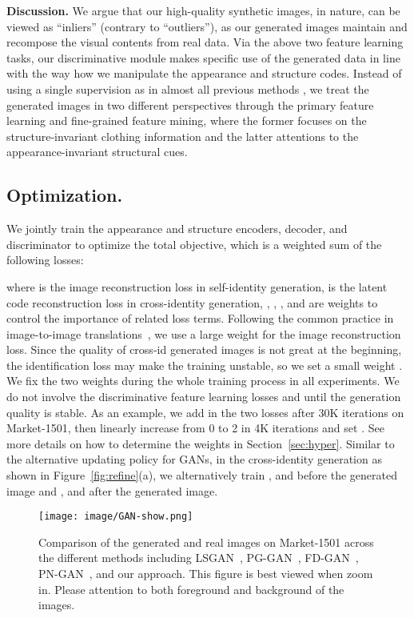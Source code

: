 \documentclass[10pt,twocolumn,letterpaper]{article}
\begin{document}
\textbf{Discussion.} 
We argue that our high-quality synthetic images, in nature, can be viewed as ``inliers'' (contrary to ``outliers''), as our generated images maintain and recompose the visual contents from real data. Via the above two feature learning tasks, our discriminative module makes specific use of the generated data in line with the way how we manipulate the appearance and structure codes. Instead of using a single supervision as in almost all previous methods \cite{zheng2017unlabeled, huang2018multi, qian2017pose}, we treat the generated images in two different perspectives through the primary feature learning and fine-grained feature mining, where the former focuses on the structure-invariant clothing information and the latter attentions to the appearance-invariant structural cues. 


\subsection{Optimization.} 
We jointly train the appearance and structure encoders, decoder, and discriminator to optimize the total objective, which is a weighted sum of the following losses:

where  is the image reconstruction loss in self-identity generation,  is the latent code reconstruction loss in cross-identity generation, , , , and  are weights to control the importance of related loss terms. Following the common practice in image-to-image translations~\cite{CycleGAN2017,lee2018diverse, huang2018multimodal}, we use a large weight  for the image reconstruction loss. Since the quality of cross-id generated images is not great at the beginning, the identification loss  may make the training unstable, so we set a small weight . We fix the two weights during the whole training process in all experiments. We do not involve the discriminative feature learning losses  and  until the generation quality is stable. As an example, we add in the two losses after 30K iterations on Market-1501, then linearly increase  from 0 to 2 in 4K iterations and set . See more details on how to determine the weights in Section~\ref{sec:hyper}. Similar to the alternative updating policy for GANs, in the cross-identity generation as shown in Figure~\ref{fig:refine}(a), we alternatively train ,  and  before the generated image and ,  and  after the generated image. 





\begin{figure*}[t]
\begin{center}
   \texttt{[image: image/GAN-show.png]}
\end{center}
\vspace{-.2in}
   \caption{Comparison of the generated and real images on Market-1501 across the different methods including LSGAN~\cite{mao2017least}, PG-GAN~\cite{ma2017pose}, FD-GAN~\cite{ge2018fdgan}, PN-GAN~\cite{qian2017pose}, and our approach. This figure is best viewed when zoom in. Please attention to both foreground and background of the images.} 
\label{fig:gan}
\end{figure*}
\end{document}
